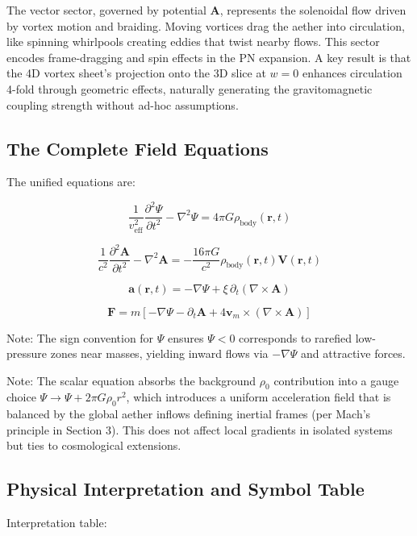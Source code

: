 \documentclass{article}
\begin{document}
The vector sector, governed by potential $\mathbf{A}$, represents the solenoidal flow driven by vortex motion and braiding. Moving vortices drag the aether into circulation, like spinning whirlpools creating eddies that twist nearby flows. This sector encodes frame-dragging and spin effects in the PN expansion. A key result is that the 4D vortex sheet's projection onto the 3D slice at $w=0$ enhances circulation 4-fold through geometric effects, naturally generating the gravitomagnetic coupling strength without ad-hoc assumptions.

\subsection{The Complete Field Equations}

The unified equations are:

\[
\boxed{\frac{1}{v_{\text{eff}}^2} \frac{\partial^2 \Psi}{\partial t^2} - \nabla^2 \Psi = 4\pi G \rho_{\text{body}}(\mathbf{r}, t)}
\]

\[
\boxed{\frac{1}{c^2} \frac{\partial^2 \mathbf{A}}{\partial t^2} - \nabla^2 \mathbf{A} = -\frac{16\pi G}{c^2} \rho_{\text{body}}(\mathbf{r}, t) \mathbf{V}(\mathbf{r}, t)}
\]

\[
\boxed{\mathbf{a}(\mathbf{r}, t) = -\nabla \Psi + \xi \, \partial_t (\nabla \times \mathbf{A})}
\]

\[
\boxed{\mathbf{F} = m \left[ -\nabla \Psi - \partial_t \mathbf{A} + 4 \mathbf{v}_m \times (\nabla \times \mathbf{A}) \right]}
\]

Note: The sign convention for $\Psi$ ensures $\Psi < 0$ corresponds to rarefied low-pressure zones near masses, yielding inward flows via $-\nabla \Psi$ and attractive forces.

Note: The scalar equation absorbs the background $\rho_0$ contribution into a gauge choice $\Psi \to \Psi + 2\pi G \rho_0 r^2$, which introduces a uniform acceleration field that is balanced by the global aether inflows defining inertial frames (per Mach's principle in Section 3). This does not affect local gradients in isolated systems but ties to cosmological extensions.

\subsection{Physical Interpretation and Symbol Table}

Interpretation table:
\end{document}
